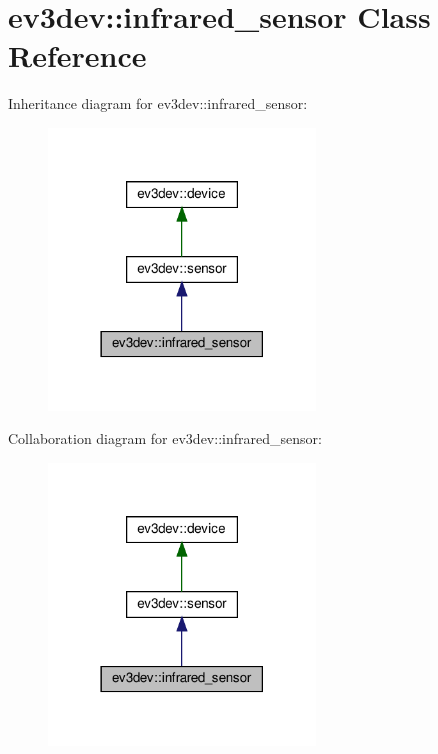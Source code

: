 \hypertarget{classev3dev_1_1infrared__sensor}{}\section{ev3dev\+:\+:infrared\+\_\+sensor Class Reference}
\label{classev3dev_1_1infrared__sensor}


Inheritance diagram for ev3dev\+:\+:infrared\+\_\+sensor\+:
\nopagebreak
\begin{figure}[H]
\begin{center}
\leavevmode
\includegraphics[width=201pt]{classev3dev_1_1infrared__sensor__inherit__graph}
\end{center}
\end{figure}


Collaboration diagram for ev3dev\+:\+:infrared\+\_\+sensor\+:
\nopagebreak
\begin{figure}[H]
\begin{center}
\leavevmode
\includegraphics[width=201pt]{classev3dev_1_1infrared__sensor__coll__graph}
\end{center}
\end{figure}
